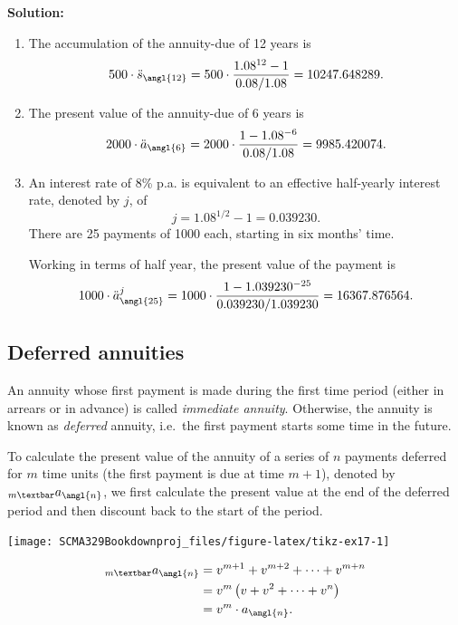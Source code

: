 \documentclass[
]{book}
\theoremstyle{definition}
\theoremstyle{definition}
\theoremstyle{definition}
\theoremstyle{definition}
\theoremstyle{remark}
\begin{document}
\textbf{Solution:}

\begin{enumerate}
\def\labelenumi{\arabic{enumi}.}
\item
  The accumulation of the annuity-due of 12 years is
  \[500 \cdot \ddot{s}_\angl{12} = 500 \cdot \frac{1.08^{12} -1}{0.08/1.08} = 10247.648289.\]
\item
  The present value of the annuity-due of 6 years is
  \[2000 \cdot \ddot{a}_\angl{6} = 2000 \cdot \frac{1- 1.08^{-6}}{0.08/1.08} = 9985.420074.\]
\item
  An interest rate of 8\% p.a. is equivalent to an effective
  half-yearly interest rate, denoted by \(j\), of
  \[j = 1.08^{1/2} -1 = 0.039230.\] There are 25 payments of 1000
  each, starting in six months' time.

  Working in terms of half year, the present value of the payment is
  \[1000 \cdot \ddot{a}^j_\angl{25} = 1000 \cdot \frac{1 - 1.039230^{-25} }{0.039230/1.039230 } = 16367.876564.\]
\end{enumerate}

\hypertarget{deferred-annuities}{%
\subsection{Deferred annuities}\label{deferred-annuities}}

An annuity whose first payment is made during the first time period
(either in arrears or in advance) is called \emph{immediate annuity}.
Otherwise, the annuity is known as \emph{deferred} annuity, i.e.~the first
payment starts some time in the future.

To calculate the present value of the annuity of a series of \(n\)
payments deferred for \(m\) time units (the first payment is due at time
\(m+1\)), denoted by \(_{m \textbar}a_\angl{n}\), we first calculate the
present value at the end of the deferred period and then discount back
to the start of the period.

\begin{center}\texttt{[image: SCMA329Bookdownproj\_files/figure-latex/tikz-ex17-1]} \end{center}

\[\begin{aligned}
    _{m \textbar} a_\angl{n}  &= v^{m+1} + v^{m+2} + \cdots +v^{m+n}  \\
    &= v^m  \left( v + v^2 + \cdots + v^n  \right) \\
    &= v^m \cdot  a_\angl{n}.\end{aligned}\]
\end{document}
